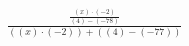 \documentclass{article}
\begin{document}
$\frac{\frac{(x)\cdot(-2)}{(4) - (-78)}}{((x)\cdot(-2)) + ((4) - (-77))}$
\end{document}
